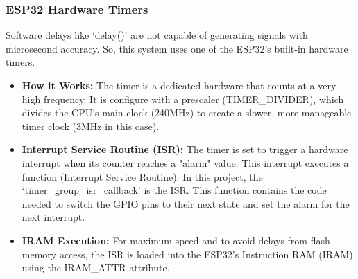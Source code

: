 \subsubsection{ESP32 Hardware Timers}
Software delays like `delay()' are not capable of generating signals with microsecond accuracy.
So, this system uses one of the ESP32's built-in hardware timers.

\begin{itemize}
    \item \textbf{How it Works:} The timer is a dedicated hardware that counts at a very high frequency.
          It is configure with a prescaler (TIMER\_DIVIDER), which divides the CPU's main clock (240MHz) to create
          a slower, more manageable timer clock (3MHz in this case).
    \item \textbf{Interrupt Service Routine (ISR):} The timer is set to trigger a hardware interrupt when its counter reaches
          a "alarm" value. This interrupt executes a function (Interrupt Service Routine). In this project, the `timer\_group\_isr\_callback'
          is the ISR. This function contains the code needed to switch the GPIO pins to their next state and set the alarm for the next
          interrupt.
    \item \textbf{IRAM Execution:} For maximum speed and to avoid delays from flash memory access, the ISR is loaded into the ESP32's
          Instruction RAM (IRAM) using the IRAM\_ATTR attribute.
\end{itemize}


